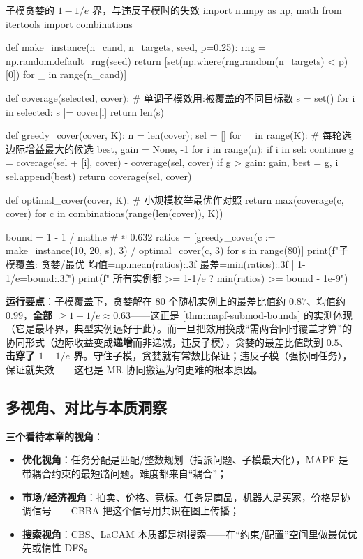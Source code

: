 \begin{codebox}[Python]{子模贪婪的 $1-1/e$ 界，与违反子模时的失效}
import numpy as np, math
from itertools import combinations

def make_instance(n_cand, n_targets, seed, p=0.25):
    rng = np.random.default_rng(seed)
    return [set(np.where(rng.random(n_targets) < p)[0]) for _ in range(n_cand)]

def coverage(selected, cover):                      # 单调子模效用:被覆盖的不同目标数
    s = set()
    for i in selected: s |= cover[i]
    return len(s)

def greedy_cover(cover, K):
    n = len(cover); sel = []
    for _ in range(K):                              # 每轮选边际增益最大的候选
        best, gain = None, -1
        for i in range(n):
            if i in sel: continue
            g = coverage(sel + [i], cover) - coverage(sel, cover)
            if g > gain: gain, best = g, i
        sel.append(best)
    return coverage(sel, cover)

def optimal_cover(cover, K):                         # 小规模枚举最优作对照
    return max(coverage(c, cover) for c in combinations(range(len(cover)), K))

bound = 1 - 1 / math.e                               # ≈ 0.632
ratios = [greedy_cover(c := make_instance(10, 20, s), 3) / optimal_cover(c, 3) for s in range(80)]
print(f"子模覆盖: 贪婪/最优 均值={np.mean(ratios):.3f} 最差={min(ratios):.3f} | 1-1/e={bound:.3f}")
print(f"  所有实例都 >= 1-1/e ? {min(ratios) >= bound - 1e-9}")
\end{codebox}

\textbf{运行要点}：子模覆盖下，贪婪解在 $80$ 个随机实例上的最差比值约 $0.87$、均值约 $0.99$，\textbf{全部 $\ge 1-1/e\approx0.63$}——这正是 \cref{thm:mapf-submod-bounds} 的实测体现（它是最坏界，典型实例远好于此）。而一旦把效用换成“需两台同时覆盖才算”的协同形式（边际收益变成\textbf{递增}而非递减，违反子模），贪婪的最差比值跌到 $0.5$、\textbf{击穿了 $1-1/e$ 界}。守住子模，贪婪就有常数比保证；违反子模（强协同任务），保证就失效——这也是 MR 协同搬运为何更难的根本原因。

\subsection{多视角、对比与本质洞察}
\label{sec:mapf-submod-views}

\textbf{三个看待本章的视角}：

\begin{itemize}
  \item \textbf{优化视角}：任务分配是匹配/整数规划（指派问题、子模最大化），MAPF 是带耦合约束的最短路问题。难度都来自“耦合”；
  \item \textbf{市场/经济视角}：拍卖、价格、竞标。任务是商品，机器人是买家，价格是协调信号——CBBA 把这个信号用共识在图上传播；
  \item \textbf{搜索视角}：CBS、LaCAM 本质都是树搜索——在“约束/配置”空间里做最优优先或惰性 DFS。
\end{itemize}

